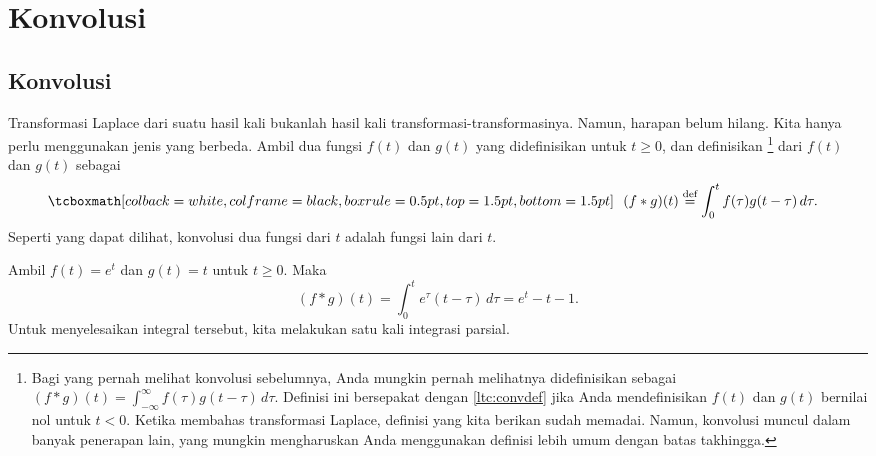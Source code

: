 
\sectionnewpage
\section{Konvolusi}
\label{convolution:section}



\subsection{Konvolusi}

Transformasi Laplace dari suatu hasil kali bukanlah hasil kali
transformasi-transformasinya.  Namun, harapan belum hilang.  Kita hanya perlu menggunakan
jenis  yang berbeda.
Ambil
dua fungsi $f(t)$ dan $g(t)$ yang didefinisikan untuk $t \geq 0$,
dan definisikan \emph{}%
\footnote{%
Bagi yang pernah melihat konvolusi sebelumnya, Anda mungkin pernah
melihatnya didefinisikan sebagai
$(f * g)(t) =
\int_{-\infty}^\infty f(\tau) g(t-\tau) \, d\tau$.  Definisi ini
bersepakat dengan \eqref{ltc:convdef} jika Anda mendefinisikan $f(t)$ dan $g(t)$
bernilai nol untuk $t < 0$.
Ketika membahas transformasi Laplace, definisi yang kita berikan sudah
memadai.  Namun, konvolusi muncul dalam banyak penerapan lain,
yang mungkin mengharuskan Anda menggunakan definisi lebih umum dengan batas takhingga.
}
dari $f(t)$ dan $g(t)$ sebagai
\begin{equation} \label{ltc:convdef}
\mybxbg{~~
(f * g)(t) \overset{\text{def}}{=}
\int_0^t f(\tau) g(t-\tau) \, d\tau .
~~}
\end{equation}
Seperti yang dapat dilihat, konvolusi dua fungsi dari $t$ adalah fungsi lain dari $t$.


\begin{example}
Ambil $f(t) = e^t$ dan $g(t) = t$ untuk $t \geq 0$.  Maka 
\begin{equation*}
(f*g)(t)
=
\int_0^t e^\tau (t-\tau) \, d\tau
=
e^t - t - 1 .
\end{equation*}
Untuk menyelesaikan integral tersebut, kita
melakukan satu kali integrasi parsial.
\end{example}


